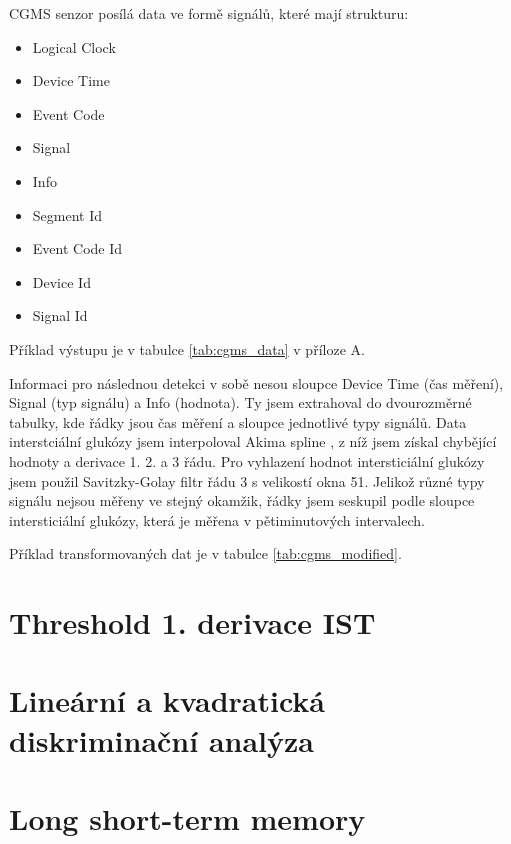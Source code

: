 CGMS senzor posílá data ve formě signálů, které mají strukturu:

\begin{itemize}
\setlength\itemsep{0em}
\item Logical Clock
\item Device Time
\item Event Code
\item Signal
\item Info
\item Segment Id
\item Event Code Id
\item Device Id
\item Signal Id
\end{itemize}

Příklad výstupu je v tabulce \ref{tab:cgms_data} v příloze A.

Informaci pro následnou detekci v sobě nesou sloupce Device Time (čas měření), Signal (typ signálu) a Info (hodnota). Ty jsem extrahoval do dvourozměrné tabulky, kde řádky jsou čas měření a sloupce jednotlivé typy signálů.
Data interstciální glukózy jsem interpoloval Akima spline \citep{cho.akima}, z níž jsem získal chybějící hodnoty a derivace 1. 2. a 3 řádu. Pro vyhlazení hodnot intersticiální glukózy jsem použil Savitzky-Golay filtr \citep{cho.savgol} řádu 3 s velikostí okna 51. Jelikož různé typy signálu nejsou měřeny ve stejný okamžik, řádky jsem seskupil podle sloupce intersticiální glukózy, která je měřena v pětiminutových intervalech.

Příklad transformovaných dat je v tabulce \ref{tab:cgms_modified}.

\section{Threshold 1. derivace IST}
\label{ch:threshold}




\section{Lineární a kvadratická diskriminační analýza}
\label{ch:lda_qda}




\section{Long short-term memory}
\label{ch:lstm}

